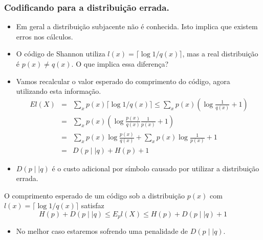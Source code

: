 \begin{frame}[allowframebreaks]
  \frametitle{Codificando para a distribuição errada.}
  \begin{itemize}
  \item Em geral a distribuição subjacente não é conhecida. Isto implica que existem erros nos cálculos.
  \item O código de Shannon utiliza $l(x) = \lceil \log 1/q(x) \rceil$, mas a real distribuição é
	$p(x) \neq q(x)$. O que implica essa diferença?
  \item Vamos recalcular o valor esperado do comprimento do código, agora utilizando esta informação.
	\begin{eqnarray}
	E l(X) &=& \sum_x p(x) \lceil \log 1/q(x) \rceil \leq \sum_x p(x) \left( \log \frac{1}{q(x)} + 1 \right) \nonumber \\
		&=& \sum_x p(x) \left( \log \frac{p(x)}{q(x)} \frac{1}{p(x)} + 1 \right) \nonumber \\
		&=& \sum_x p(x) \log \frac{p(x)}{q(x)} + \sum_x p(x) \log \frac{1}{p(x)} + 1 \nonumber \\
		&=& D(p \mid \mid q) + H(p) + 1
	\end{eqnarray}
  \item $D(p \mid \mid q)$ é o custo adicional por símbolo causado por utilizar a distribuição errada.
  \end{itemize}
  
  \begin{theorem}
  O comprimento esperado de um código sob a distribuição $p(x)$ com $l(x) = \lceil \log 1/q(x) \rceil$ satisfaz
	\begin{equation}
	H(p) + D(p \mid \mid q) \leq E_p l(X) \leq H(p) + D(p \mid \mid q) + 1
	\end{equation}
  \end{theorem}
  \begin{itemize}
  \item No melhor caso estaremos sofrendo uma penalidade de $D(p \mid \mid q)$.
  \end{itemize}
\end{frame}


